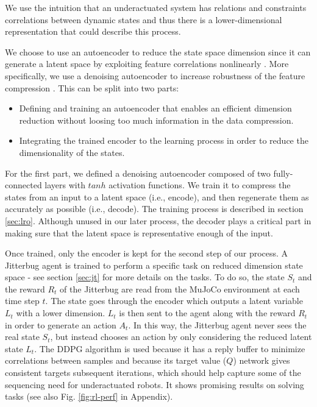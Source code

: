 \documentclass[letterpaper, 10 pt, conference]{ieeeconf}
\begin{document}
We use the intuition that an underactuated system has relations and constraints correlations between dynamic states %
and thus there is a lower-dimensional representation that could describe this process. 

We choose to use an autoencoder to reduce the state space dimension since it can generate a latent space by exploiting feature correlations nonlinearly \cite{AE_hinton2006reducing}. More specifically, we use a denoising autoencoder to increase robustness of the feature compression \cite{vincent2008extracting}.
This can be split into two parts:
\begin{itemize}
\item Defining and training an autoencoder that enables an efficient dimension reduction without loosing too much information in the data compression. 
\item Integrating the trained encoder to the learning process in order to reduce the dimensionality of the states.
\end{itemize}
For the first part, we defined a denoising autoencoder composed of two fully-connected layers with $tanh$ activation functions. We train it to compress the states from an input to a latent space (i.e., encode), and then regenerate them as accurately as possible (i.e., decode). The training process is described in section \ref{sec:lro}. Although unused in our later process, the decoder plays a critical part in making sure that the latent space is representative enough of the input.

Once trained, only the encoder is kept for the second step of our process. A Jitterbug agent is trained to perform a specific task on reduced dimension state space - see section \ref{sec:jt} for more details on the tasks. To do so, the state $S_t$ and the reward $R_t$  of the Jitterbug are read from the MuJoCo environment \cite{Todorov2012MuJoCo} at each time step $t$. The state goes through the encoder which outputs a latent variable $L_t$ with a lower dimension. $L_t$ is then sent to the agent along with the reward $R_t$ in order to generate an action $A_t$. In this way, the Jitterbug agent never sees the real state $S_t$, but instead chooses an action by only considering the reduced latent state $L_t$. The  DDPG algorithm is used because it has a reply buffer to minimize correlations between samples and because its target value ($Q$) network gives consistent targets subsequent iterations, which should help capture some of the sequencing need for underactuated robots.  It shows promising results on solving tasks (see also Fig. \ref{fig:rl-perf} in Appendix).
\end{document}
